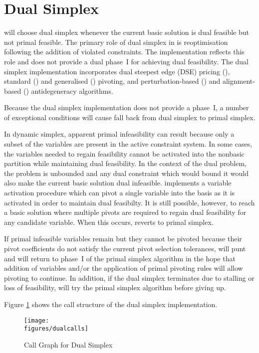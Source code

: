 \section{Dual Simplex}

\dylp will choose dual simplex whenever the current basic solution is dual
feasible but not primal feasible.
The primary role of dual simplex in \dylp is reoptimisation following
the addition of violated constraints.
The implementation reflects this role and does not provide a dual phase~I for
achieving dual feasibility.
The dual simplex implementation incorporates dual steepest edge (DSE)
pricing (),
standard () and
generalised () pivoting, and
perturbation-based () and
alignment-based ()
antidegeneracy algorithms.

Because the dual simplex implementation does not provide a phase~I,
a number of exceptional conditions will cause
\dylp fall back from dual simplex to primal simplex.

In dynamic simplex, apparent primal infeasibility can result because only a
subset of the variables are present in the active constraint system.
In some cases, the variables needed to regain feasibility cannot be activated
into the nonbasic partition while maintaining dual feasibility.
In the context of the dual problem, the problem is unbounded and any
dual constraint which would bound it would also make the current basic
solution dual infeasible.
\dylp implements a variable activation procedure which can pivot a
single variable into the basis as it is activated in order to maintain dual
feasibilty.
It is still possible, however, to reach a basic solution where multiple
pivots are required to regain dual feasibility for any candidate variable.
When this occurs, \dylp reverts to primal simplex.

If primal infeasible variables remain but they cannot be pivoted because
their pivot coefficients do not satisfy the current pivot selection tolerances,
 will punt and \dylp will return to phase~I of the primal
simplex algorithm in the hope that addition of variables and/or the
application of primal pivoting rules will allow pivoting to continue.
In addition, if the dual simplex terminates due to stalling or loss of
feasibility, \dylp will try the primal simplex algorithm before giving up.

Figure \ref{fig:DualCallGraph} shows the call structure of the dual simplex
implementation.
\begin{figure}[htb]
\centering
\texttt{[image: \\figures/dualcalls]}
\caption{Call Graph for Dual Simplex} \label{fig:DualCallGraph}
\end{figure}

